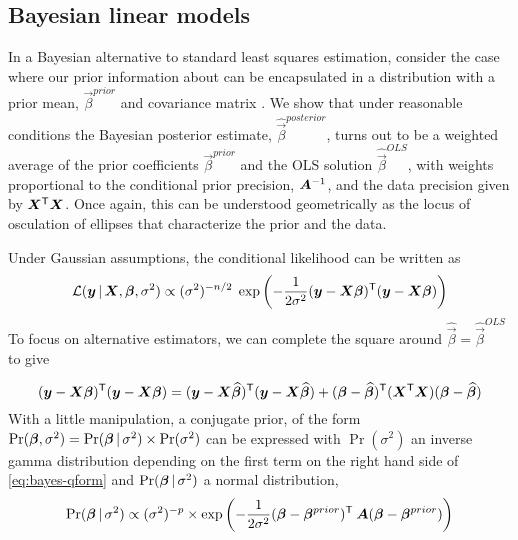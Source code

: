 \subsection{Bayesian linear models}
In a Bayesian alternative to standard least squares estimation, consider the case where our prior
information about \vec{\beta} can be encapsulated in a distribution with a prior mean,
$\vec{\beta}^{prior}$ and covariance matrix .  We show that under reasonable conditions
the Bayesian posterior 
estimate, $\widehat{\vec{\beta}}^{posterior}$, turns out
to be a weighted average of the prior coefficients $\vec{\beta}^{prior}$ and the OLS solution $\widehat{\vec{\beta}}^{OLS}$,
with weights proportional to the conditional prior precision, $\bm{A}^{-1}$, and the data precision given by
$\bm{X}^\mathsf{T}\bm{X}$.   Once again, this can be understood geometrically as the locus of osculation of 
ellipses that characterize the prior and the data.

Under Gaussian assumptions, 
the conditional likelihood can be written as
\begin{equation*}
\mathcal{L} (\bm{y} \, | \, \bm{X}, \bm{\beta}, \sigma^2) \propto
   (\sigma^2)^{-n/2} \; \exp \left( -\frac{1}{2 \sigma^2} (\bm{y}-\bm{X} \bm{\beta}) ^\mathsf{T}  (\bm{y}-\bm{X} \bm{\beta})   \right)
\end{equation*}
To focus on alternative estimators, we can complete the square around $\widehat{\vec{\beta}} = \widehat{\vec{\beta}}^{OLS}$ to give

\begin{equation} \label{eq:bayes-qform}
(\bm{y}- \bm{X} \bm{\beta})^\mathsf{T}(\bm{y}- \bm{X} \bm{\beta}) = 
(\bm{y}- \bm{X} \widehat{\bm{\beta}})^\mathsf{T}(\bm{y}- \bm{X} \widehat{\bm{\beta}}) + 
(\bm{\beta} - \widehat{\bm{\beta}})^\mathsf{T}(\bm{X}^\mathsf{T}\bm{X})(\bm{\beta} - \widehat{\bm{\beta}})
\end{equation}
With a little manipulation, a conjugate prior, of the form $\Pr (\bm{\beta}, \sigma^2) = \Pr (\bm{\beta} \, | \, \sigma^2) \times \Pr (\sigma^2)$
can be expressed with $\Pr (\sigma^2)$ an inverse gamma distribution depending on the first term on the right hand side of \eqref{eq:bayes-qform}
and $\Pr (\bm{\beta} \, | \, \sigma^2)$ a normal distribution,
\begin{equation}
\Pr (\bm{\beta} \, | \, \sigma^2) \propto (\sigma^2)^{-p}  \times \exp \left( -\frac{1}{2 \sigma^2}  (\bm{\beta} - \bm{\beta}^{prior}) ^\mathsf{T}  \: \bm{A} (\bm{\beta} - \bm{\beta}^{prior})  \right)
\end{equation}

